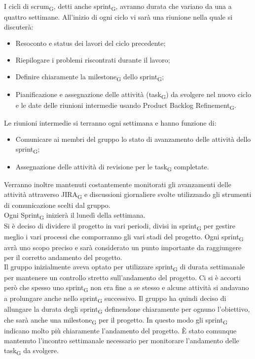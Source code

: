 I cicli di scrum\textsubscript{G}, detti anche sprint\textsubscript{G}, avranno durata che variano da una a quattro settimane. All'inizio di ogni ciclo vi sarà una riunione nella quale si discuterà:
\begin{itemize}
	\item Resoconto e status dei lavori del ciclo precedente;
	\item Riepilogare i problemi riscontrati durante il lavoro;
	\item Definire chiaramente la milestone\textsubscript{G} dello sprint\textsubscript{G};
	\item Pianificazione e assegnazione delle attività (task\textsubscript{G}) da svolgere nel nuovo ciclo e le date delle riunioni intermedie usando Product Backlog Refinement\textsubscript{G}.
\end{itemize}
Le riunioni intermedie si terranno ogni settimana e hanno funzione di:
\begin{itemize}
	\item Comunicare ai membri del gruppo lo stato di avanzamento delle attività dello sprint\textsubscript{G};
	\item Assegnazione delle attività di revisione per le task\textsubscript{G} completate.
\end{itemize}
Verranno inoltre mantenuti costantemente monitorati gli avanzamenti delle attività attraverso JIRA\textsubscript{G} e discussioni giornaliere svolte utilizzando gli strumenti di comunicazione scelti dal gruppo.\\
Ogni Sprint\textsubscript{G} inizierà il lunedì della settimana.\\
Si è deciso di dividere il progetto in vari periodi, divisi in sprint\textsubscript{G} per gestire meglio i vari processi che comporranno gli vari stadi del progetto. Ogni sprint\textsubscript{G} avrà uno scopo preciso e sarà considerato un punto importante da raggiungere per il corretto andamento del progetto.\\
Il gruppo inizialmente aveva optato per utilizzare sprint\textsubscript{G} di durata settimanale per mantenere un controllo stretto sull'andamento del progetto. Ci si è accorti però che spesso uno sprint\textsubscript{G} non era fine a se stesso e alcune attività si andavano a prolungare anche nello sprint\textsubscript{G} successivo. Il gruppo ha quindi deciso di allungare la durata degli sprint\textsubscript{G}  definendone chiaramente per ognuno l'obiettivo, che sarà anche una milestone\textsubscript{G} per il progetto. In questo modo gli sprint\textsubscript{G} indicano molto più chiaramente l'andamento del progetto. È stato comunque mantenuto l'incontro settimanale necessario per monitorare l'andamento delle task\textsubscript{G} da svolgere.
\newpage
